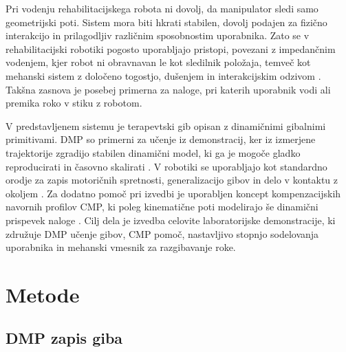 \documentclass[a4paper]{article}
\begin{document}
Pri vodenju rehabilitacijskega robota ni dovolj, da manipulator sledi samo
geometrijski poti. Sistem mora biti hkrati stabilen, dovolj podajen za fizično
interakcijo in prilagodljiv različnim sposobnostim uporabnika. Zato se v
rehabilitacijski robotiki pogosto uporabljajo pristopi, povezani z impedančnim
vodenjem, kjer robot ni obravnavan le kot sledilnik položaja, temveč kot
mehanski sistem z določeno togostjo, dušenjem in interakcijskim odzivom
\cite{hogan1985impedance}. Takšna zasnova je posebej primerna za naloge, pri
katerih uporabnik vodi ali premika roko v stiku z robotom.

V predstavljenem sistemu je terapevtski gib opisan z dinamičnimi gibalnimi
primitivami. DMP so primerni za učenje iz demonstracij, ker iz izmerjene
trajektorije zgradijo stabilen dinamični model, ki ga je mogoče gladko
reproducirati in časovno skalirati \cite{schaal2006dmp,ijspeert2013dmp}. V
robotiki se uporabljajo kot standardno orodje za zapis motoričnih spretnosti,
generalizacijo gibov in delo v kontaktu z okoljem \cite{saveriano2023dmp}. Za
dodatno pomoč pri izvedbi je uporabljen koncept kompenzacijskih navornih
profilov CMP, ki poleg kinematične poti modelirajo še dinamični prispevek naloge
\cite{denisa2016cmp,petric2018cmp}. Cilj dela je izvedba celovite laboratorijske
demonstracije, ki združuje DMP učenje gibov, CMP pomoč, nastavljivo stopnjo
sodelovanja uporabnika in mehanski vmesnik za razgibavanje roke.

\section{Metode}

\subsection{DMP zapis giba}
\end{document}
